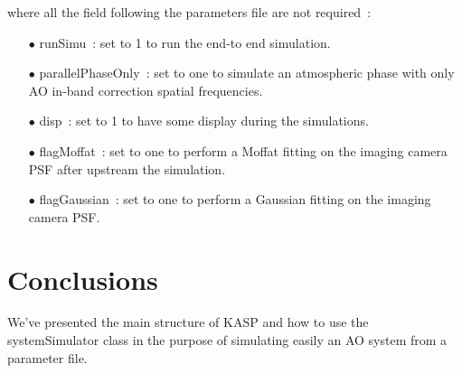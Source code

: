 \documentclass[12pt]{article}
\begin{document}
where all the field following the parameters file are not required~:
\begin{itemize}
	\item[$\bullet$] runSimu~: set to 1 to run the end-to end simulation.
	\item[$\bullet$] parallelPhaseOnly~: set to one to simulate an atmospheric phase with only AO in-band correction spatial frequencies.
	\item[$\bullet$] disp~: set to 1 to have some display during the simulations.
	\item[$\bullet$] flagMoffat~: set to one to perform a Moffat fitting on the imaging camera PSF after upstream the simulation.
	\item[$\bullet$] flagGaussian~: set to one to perform a Gaussian fitting on the imaging camera PSF.
\end{itemize}

\section{Conclusions}

We've presented the main structure of KASP and how to use the systemSimulator class in the purpose of simulating easily an AO system from a parameter file.

 

\end{document}
